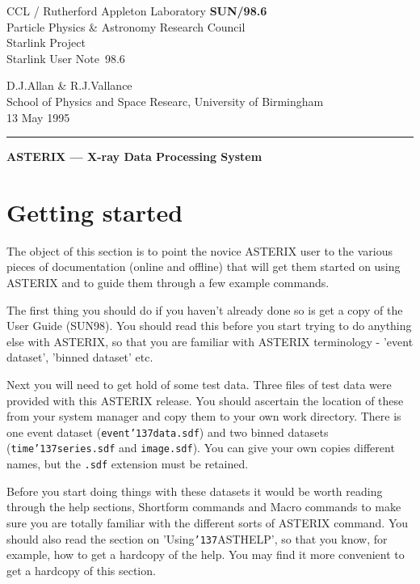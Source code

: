 \documentclass{book}
\newcommand{\stardoccategory}  {Starlink User Note}
\newcommand{\stardocinitials}  {SUN}
\newcommand{\stardocnumber}    {98.6}
\newcommand{\stardocauthors}   {D.J.Allan \& R.J.Vallance}
\newcommand{\stardocdate}      {13 May 1995}
\newcommand{\stardoctitle}     {ASTERIX --- X-ray Data Processing System}
\newcommand{\stardocname}{\stardocinitials /\stardocnumber}
\renewcommand{\_}{{\tt\char'137}}     %
\begin{document}
\thispagestyle{empty}
CCL / {\sc Rutherford Appleton Laboratory} \hfill {\bf \stardocname}\\
{\large Particle Physics \& Astronomy Research Council}\\
{\large Starlink Project\\}
{\large \stardoccategory\ \stardocnumber}

\begin{flushright}
\stardocauthors\\
School of Physics and Space Researc, University of Birmingham\\
\stardocdate
\end{flushright}
\vspace{-4mm}
\rule{\textwidth}{0.5mm}
\vspace{5mm}
\begin{center}
{\Large\bf \stardoctitle}
\end{center}
\vspace{5mm}
\setlength{\parskip}{0mm}
\tableofcontents
\setlength{\parskip}{\medskipamount}
\markright{\stardocname}
\chapter{Getting started}
The object of this section is to point the novice ASTERIX user to the
various pieces of documentation (online and offline) that will get them
started on using ASTERIX and to guide them through a few example
commands.
 
The first thing you should do if you haven't already done so is get a
copy of the User Guide (SUN98). You should read this before you start
trying to do anything else with ASTERIX, so that you are familiar with
ASTERIX terminology - 'event dataset', 'binned dataset' etc.
 
Next you will need to get hold of some test data. Three files of test
data were provided with this ASTERIX release. You should ascertain the
location of these from your system manager and copy them to your own
work directory. There is one event dataset ({\tt event\_data.sdf}) and two
binned datasets ({\tt time\_series.sdf} and {\tt image.sdf}). You can give your own
copies different names, but the {\tt .sdf} extension must be retained.
 
Before you start doing things with these datasets it would be worth
reading through the help sections, Shortform commands and
Macro commands to make sure you are totally familiar with the different
sorts of ASTERIX command. You should also read the section on
'Using\_ASTHELP', so that you know, for example, how to get a hardcopy
of the help. You may find it more convenient to get a hardcopy of
this section.
 
\end{document}
